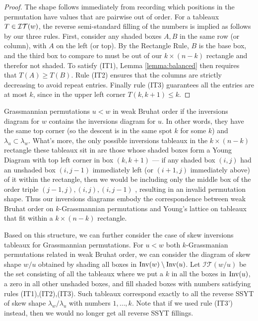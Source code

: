 \documentclass{article}
\theoremstyle{definition}
\begin{document}
\begin{proof}
    The shape follows immediately from recording which positions in the permutation have values that are pairwise out of order. For a tableaux $T \in \mathcal{IT}(w)$, the reverse semi-standard filling of the numbers is implied as follows by our three rules. First, consider any shaded boxes $A, B$ in the same row (or column), with $A$ on the left (or top). By the Rectangle Rule, $B$ is the base box, and the third box to compare to must be out of our $k \times (n-k)$ rectangle and therefor not shaded. To satisfy (IT1), Lemma \ref{lemma:balanced} then requires that $T(A) \geq T(B)$. Rule (IT2) ensures that the columns are strictly decreasing to avoid repeat entries. Finally rule (IT3) guarantees all the entries are at most $k$, since in the upper left corner $T(k,k+1) \leq k$.
\end{proof}

Grassmannian permutations $u < w$ in weak Bruhat order if the inversions diagram for $w$ contains the inversions diagram for $u$. In other words, they have the same top corner (so the descent is in the same spot $k$ for some $k$) and $\lambda_u \subset \lambda_w$. What's more, the only possible inversions tableaux in the $k \times (n-k)$ rectangle these tableaux sit in are those whose shaded boxes form a Young Diagram with top left corner in box $(k, k+1)$ --- if any shaded box $(i,j)$ had an unshaded box $(i, j-1)$ immediately left (or $(i+1, j)$ immediately above) of it within the rectangle, then we would be including only the middle box of the order triple $(j-1, j), (i,j), (i,j-1)$ , resulting in an invalid permutation shape. Thus our inversions diagrams embody the correspondence between weak Bruhat order on $k$-Grassmannian permutations and Young's lattice on tableaux that fit within a $k \times (n-k)$ rectangle. 



Based on this structure, we can further consider the case of skew inversions tableaux for Grassmannian permutations. For $u < w$ both $k$-Grassmanian permutations related in weak Bruhat order, we can consider the diagram of skew shape $w/u$ obtained by shading all boxes in $\mathrm{Inv}(w) \setminus \mathrm{Inv}(u)$. Let $\mathcal{IT}(w/u)$ be the set consisting of all the tableaux where we put a $k$ in all the boxes in $\mathrm{Inv}(u)$, a zero in all other unshaded boxes, and fill shaded boxes with numbers satisfying rules (IT1),(IT2),(IT3). Such tableaux correspond exactly to all the reverse SSYT of skew shape $\lambda_w/\lambda_u$ with numbers $1, \dots, k$. Note that if we used rule (IT3') instead, then we would no longer get all reverse SSYT fillings.
\end{document}
